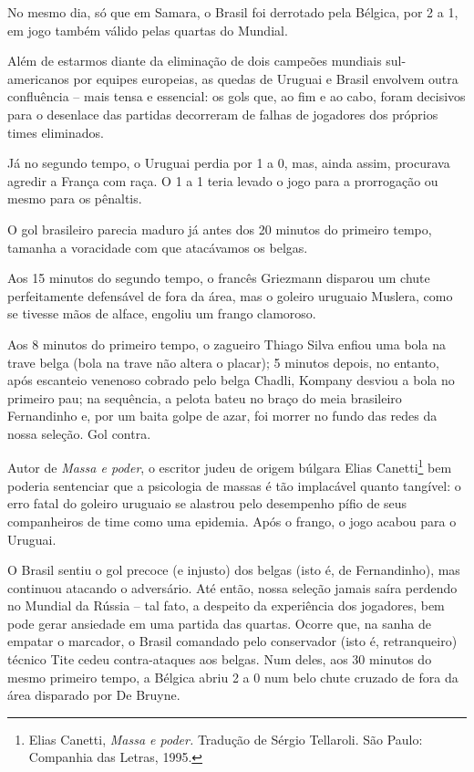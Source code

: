 No mesmo dia, só que em Samara, o Brasil foi derrotado pela Bélgica, por
2 a 1, em jogo também válido pelas quartas do Mundial.

Além de estarmos diante da eliminação de dois campeões mundiais
sul-americanos por equipes europeias, as quedas de Uruguai e Brasil
envolvem outra confluência -- mais tensa e essencial: os gols que, ao
fim e ao cabo, foram decisivos para o desenlace das partidas decorreram
de falhas de jogadores dos próprios times eliminados.

Já no segundo tempo, o Uruguai perdia por 1 a 0, mas, ainda assim,
procurava agredir a França com raça. O 1 a 1 teria levado o jogo para a
prorrogação ou mesmo para os pênaltis.

O gol brasileiro parecia maduro já antes dos 20 minutos do primeiro
tempo, tamanha a voracidade com que atacávamos os belgas.

Aos 15 minutos do segundo tempo, o francês Griezmann disparou um chute
perfeitamente defensável de fora da área, mas o goleiro uruguaio
Muslera, como se tivesse mãos de alface, engoliu um frango clamoroso.

Aos 8 minutos do primeiro tempo, o zagueiro Thiago Silva enfiou uma bola
na trave belga (bola na trave não altera o placar); 5 minutos depois, no
entanto, após escanteio venenoso cobrado pelo belga Chadli, Kompany
desviou a bola no primeiro pau; na sequência, a pelota bateu no braço do
meia brasileiro Fernandinho e, por um baita golpe de azar, foi morrer no
fundo das redes da nossa seleção. Gol contra.

Autor de \emph{Massa e poder}, o escritor judeu de origem búlgara Elias
Canetti\footnote{Elias Canetti, \emph{Massa e poder.} Tradução de Sérgio
  Tellaroli. São Paulo: Companhia das Letras, 1995.} bem poderia
sentenciar que a psicologia de massas é tão implacável quanto tangível:
o erro fatal do goleiro uruguaio se alastrou pelo desempenho pífio de
seus companheiros de time como uma epidemia. Após o frango, o jogo
acabou para o Uruguai.

O Brasil sentiu o gol precoce (e injusto) dos belgas (isto é, de
Fernandinho), mas continuou atacando o adversário. Até então, nossa
seleção jamais saíra perdendo no Mundial da Rússia -- tal fato, a
despeito da experiência dos jogadores, bem pode gerar ansiedade em uma
partida das quartas. Ocorre que, na sanha de empatar o marcador, o
Brasil comandado pelo conservador (isto é, retranqueiro) técnico Tite
cedeu contra-ataques aos belgas. Num deles, aos 30 minutos do mesmo
primeiro tempo, a Bélgica abriu 2 a 0 num belo chute cruzado de fora da
área disparado por De Bruyne.

